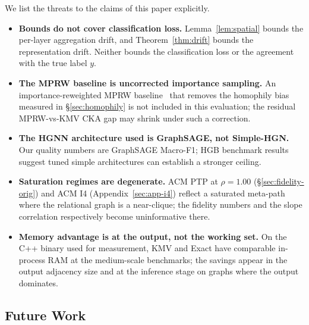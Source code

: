 \documentclass[sigconf]{acmart}
\begin{document}
We list the threats to the claims of this paper explicitly.

\begin{itemize}
\item \textbf{Bounds do not cover classification loss.} Lemma~\ref{lem:spatial} bounds the per-layer aggregation drift, and Theorem~\ref{thm:drift} bounds the representation drift. Neither bounds the classification loss or the agreement with the true label $y$.
\item \textbf{The MPRW baseline is uncorrected importance sampling.} An importance-reweighted MPRW baseline~\cite{frasca2020sign,zhang2022gamlp} that removes the homophily bias measured in \S\ref{sec:homophily} is not included in this evaluation; the residual MPRW-vs-KMV CKA gap may shrink under such a correction.
\item \textbf{The HGNN architecture used is GraphSAGE, not Simple-HGN.} Our quality numbers are GraphSAGE Macro-F1; HGB benchmark results suggest tuned simple architectures can establish a stronger ceiling.
\item \textbf{Saturation regimes are degenerate.} ACM PTP at $\rho{=}1.00$ (\S\ref{sec:fidelity-orig}) and ACM I4 (Appendix~\ref{sec:app-i4}) reflect a saturated meta-path where the relational graph is a near-clique; the fidelity numbers and the slope correlation respectively become uninformative there.
\item \textbf{Memory advantage is at the output, not the working set.} On the C++ binary used for measurement, KMV and Exact have comparable in-process RAM at the medium-scale benchmarks; the savings appear in the output adjacency size and at the inference stage on graphs where the output dominates.
\end{itemize}

\subsection{Future Work}
\label{sec:future}
\end{document}
